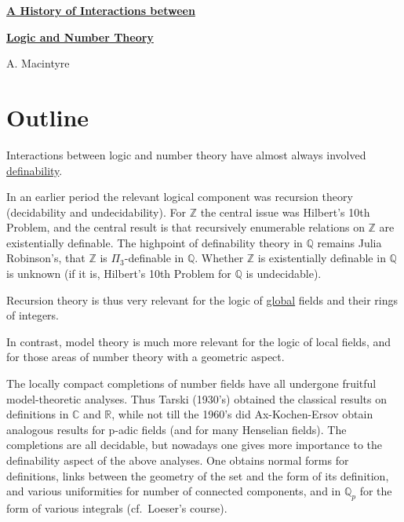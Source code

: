\documentclass{article}
\begin{document}
\Large
\begin{center}
\underline{\bf {A History of Interactions between}}

\underline{\bf{ Logic and
Number Theory}}

\vspace{3mm}
A. Macintyre

\end{center}
\normalsize



\section{Outline}

Interactions between logic and number theory have almost 
always
involved \underline{definability}.



In an earlier period the relevant logical component was 
recursion
theory (decidability and undecidability). For ${\mathbb Z}$ 
the
central issue was Hilbert's 10th Problem, and the central 
result
is that recursively enumerable relations on ${\mathbb Z}$ are
existentially definable. The highpoint of definability theory 
in
${\mathbb Q}$ remains Julia Robinson's, that ${\mathbb Z}$ is
$\Pi_3$-definable in ${\mathbb Q}$. Whether ${\mathbb Z}$ is
existentially definable in ${\mathbb Q}$ is unknown (if it 
is,
Hilbert's 10th Problem for ${\mathbb Q}$ is undecidable).



Recursion theory is thus very relevant for the logic of
\underline {global} fields and their rings of integers.



In contrast, model theory is much more relevant for the logic 
of
local fields, and for those areas of number theory with a
geometric aspect.



The locally compact completions of number fields have all
undergone  fruitful model-theoretic analyses. Thus Tarski 
(1930's)
obtained the classical results on definitions in ${\mathbb 
C}$ and
${\mathbb R}$, while not till the 1960's did Ax-Kochen-Ersov 
obtain
analogous results for p-adic fields (and for many Henselian
fields). The completions are all decidable, but nowadays one 
gives
more importance to the definability aspect of the above 
analyses.
One obtains normal forms for definitions, links between the
geometry of the set and the form of its definition, and 
various
uniformities for number of connected components, and in 
${\mathbb Q}_p$ for the form of various integrals (cf.~Loeser's course).
\end{document}
